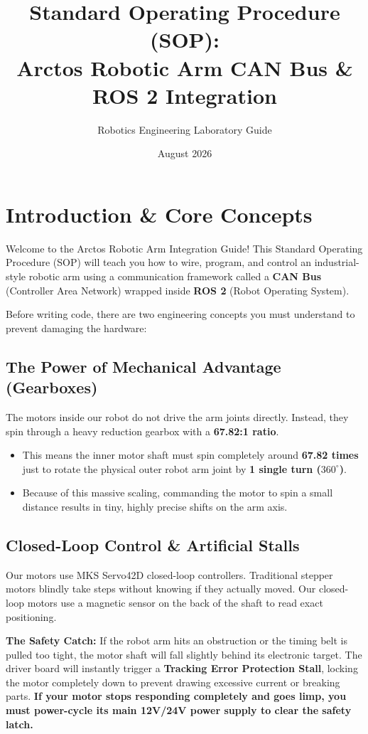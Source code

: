 \documentclass[11pt,letterpaper]{article}
\title{Standard Operating Procedure (SOP): \\ Arctos Robotic Arm CAN Bus \& ROS 2 Integration}
\author{Robotics Engineering Laboratory Guide}
\date{August 2026}
\begin{document}
\maketitle
\tableofcontents
\newpage

\section{Introduction \& Core Concepts}
Welcome to the Arctos Robotic Arm Integration Guide! This Standard Operating Procedure (SOP) will teach you how to wire, program, and control an industrial-style robotic arm using a communication framework called a \textbf{CAN Bus} (Controller Area Network) wrapped inside \textbf{ROS 2} (Robot Operating System).

Before writing code, there are two engineering concepts you must understand to prevent damaging the hardware:

\subsection{The Power of Mechanical Advantage (Gearboxes)}
The motors inside our robot do not drive the arm joints directly. Instead, they spin through a heavy reduction gearbox with a \textbf{67.82:1 ratio}. 
\begin{itemize}
    \item This means the inner motor shaft must spin completely around \textbf{67.82 times} just to rotate the physical outer robot arm joint by \textbf{1 single turn ($360^\circ$)}.
    \item Because of this massive scaling, commanding the motor to spin a small distance results in tiny, highly precise shifts on the arm axis.
\end{itemize}

\subsection{Closed-Loop Control \& Artificial Stalls}
Our motors use MKS Servo42D closed-loop controllers. Traditional stepper motors blindly take steps without knowing if they actually moved. Our closed-loop motors use a magnetic sensor on the back of the shaft to read exact positioning. 

\textbf{The Safety Catch:} If the robot arm hits an obstruction or the timing belt is pulled too tight, the motor shaft will fall slightly behind its electronic target. The driver board will instantly trigger a \textbf{Tracking Error Protection Stall}, locking the motor completely down to prevent drawing excessive current or breaking parts. \textbf{If your motor stops responding completely and goes limp, you must power-cycle its main 12V/24V power supply to clear the safety latch.}
\end{document}
